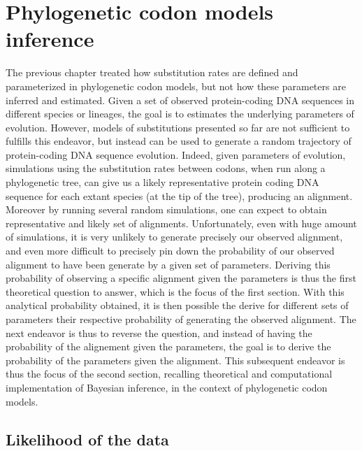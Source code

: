 \chapter{Phylogenetic {codon} models inference}
{
	\hypersetup{linkcolor=GREYDARK}
	\minitoc
}
\label{sec:phylo_codon_models}

The previous chapter treated how \gls{substitution} rates are defined and parameterized in phylogenetic codon models, but not how these parameters are inferred and estimated.
Given a set of observed protein-coding \acrshort{DNA} sequences in different species or lineages, the goal is to estimates the underlying parameters of evolution.
However, models of \glspl{substitution} presented so far are not sufficient to fulfills this endeavor, but instead can be used to generate a random trajectory of protein-coding \acrshort{DNA} sequence evolution.
Indeed, given parameters of evolution, simulations using the \gls{substitution} rates between \glspl{codon}, when run along a phylogenetic tree, can give us a likely representative protein coding \acrshort{DNA} sequence for each extant species (at the tip of the tree), producing an alignment. 
Moreover by running several random simulations, one can expect to obtain representative and likely set of alignments.
Unfortunately, even with huge amount of simulations, it is very unlikely to generate precisely our observed alignment, and even more difficult to precisely pin down the probability of our observed alignment to have been generate by a given set of parameters.
Deriving this probability of observing a specific alignment given the parameters is thus the first theoretical question to answer, which is the focus of the first section.
With this analytical probability obtained, it is then possible the derive for different sets of parameters their respective probability of generating the observed alignment.
The next endeavor is thus to reverse the question, and instead of having the probability of the alignement given the parameters, the goal is to derive the probability of the parameters given the alignment.
This subsequent endeavor is thus the focus of the second section, recalling theoretical and computational implementation of Bayesian inference, in the context of phylogenetic \gls{codon} models.

\section{Likelihood of the data}
\label{sec-intro:likelihood}

